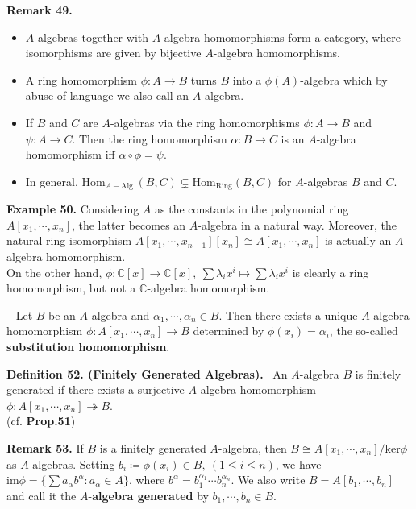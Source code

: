 \documentclass[12pt,a4paper,footinclude=true,headinclude=true]{scrbook} %
\newenvironment{proposition}[2][]
{\renewcommand\theinnercustomprop{#2}\innercustomprop[#1] 
\begin{mdframed}[backgroundcolor=gray!20]\ }
{\end{mdframed}\endinnercustomprop}
\newenvironment{definition}[2][Definition]
    { \begin{mdframed}[backgroundcolor=gray!20] \textbf{#1 #2.}\ }
    {  \end{mdframed}}
\newenvironment{remark}[2][Remark]
    { \begin{mdframed}[backgroundcolor=gray!20] \textbf{#1 #2.} }
    {  \end{mdframed}}
\newenvironment{example}[2][Example]
    { \begin{mdframed}[backgroundcolor=gray!20] \textbf{#1 #2.} }
    {  \end{mdframed}}
\begin{document}
\begin{remark}{49}
    \begin{itemize}
        \item[(a)] $A$-algebras together with $A$-algebra homomorphisms form a category, where isomorphisms are given by bijective $A$-algebra homomorphisms.
        \item[(b)] A ring homomorphism $\phi:A\to B$ turns $B$ into a $\phi(A)$-algebra which by abuse of language we also call an $A$-algebra. 
        \item[(c)] If $B$ and $C$ are $A$-algebras via the ring homomorphisms $\phi:A\to B$ and $\psi:A\to C$. Then the ring homomorphism $\alpha:B\to C$ is an $A$-algebra homomorphism iff $\alpha\circ\phi=\psi$.
        \item[(d)] In general, $\mathrm{Hom}_{A-\text{Alg.}}(B,C) \subsetneq\mathrm{Hom}_{\text{Ring}}(B,C)$ for $A$-algebras $B$ and $C$.
    \end{itemize}
\end{remark}

\begin{example}{50}
    Considering $A$ as the constants in the polynomial ring $A[x_1,\cdots,x_n]$, the latter becomes an $A$-algebra in a natural way. Moreover, the natural ring isomorphism $A[x_1,\cdots,x_{n-1}][x_n]\cong A[x_1,\cdots,x_n]$ is actually an $A$-algebra homomorphism.\\ On the other hand, $\phi:\mathbb{C}[x]\to \mathbb{C}[x],\ \sum\lambda_ix^i\mapsto\sum\bar{\lambda}_ix^i$ is clearly a ring homomorphism, but not a $\mathbb{C}$-algebra homomorphism.
\end{example}

\begin{proposition}{51}
    Let $B$ be an $A$-algebra and $\alpha_1,\cdots,\alpha_n\in B$. Then there exists a unique $A$-algebra homomorphism $\phi:A[x_1,\cdots,x_n]\to B$ determined by $\phi(x_i)=\alpha_i$, the so-called \textbf{substitution homomorphism}.
\end{proposition}

\begin{definition}{52. (Finitely Generated Algebras)}
    An $A$-algebra $B$ is finitely generated if there exists a surjective $A$-algebra homomorphism $\phi:A[x_1,\cdots,x_n]\twoheadrightarrow B$.\\ (cf. \textbf{Prop.51})
\end{definition}

\begin{remark}{53}
    If $B$ is a finitely generated $A$-algebra, then $B\cong A[x_1,\cdots,x_n]/\mathrm{ker}\phi$ as $A$-algebras. Setting $b_i\coloneqq\phi(x_i)\in B,\ (1\leq i\leq n)$, we have $\mathrm{im}\phi=\{\sum a_\alpha b^\alpha:a_\alpha\in A\}$, where $b^\alpha=b_1^{\alpha_1}\cdots b_n^{\alpha_n}$. We also write $B=A[b_1,\cdots,b_n]$ and call it the $A$-\textbf{algebra generated} by $b_1,\cdots,b_n\in B$.
\end{remark}
\end{document}
